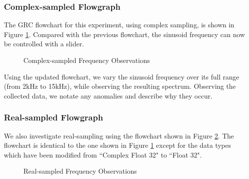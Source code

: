 \documentclass{article}
\begin{document}
 
\subsubsection{Complex-sampled Flowgraph \label{subsection::frequency_observations_complex_sampling}}

The GRC flowchart for this experiment, using complex sampling, is shown in Figure \ref{fig::frequency_observations_complex_sampling}. Compared with the previous flowchart, the sinusoid frequency can now be controlled with a slider.

\begin{figure}[H]
	\centerline{}
	\caption{Complex-sampled Frequency Observations}
	\label{fig::frequency_observations_complex_sampling}
\end{figure}

Using the updated flowchart, we vary the sinusoid frequency over its full range (from 2kHz to 15kHz), while observing the resulting spectrum. Observing the collected data, we notate any anomalies and describe why they occur. 

\subsubsection{Real-sampled Flowgraph}

We also investigate real-sampling using the flowchart shown in Figure \ref{fig::frequency_observations_real_sampling}. The flowchart is identical to the one shown in Figure \ref{fig::frequency_observations_complex_sampling} except for the data types which have been modified from ``Complex Float 32" to ``Float 32".

\begin{figure}[H]
	\centerline{}
	\caption{Real-sampled Frequency Observations}
	\label{fig::frequency_observations_real_sampling}
\end{figure}
\end{document}
